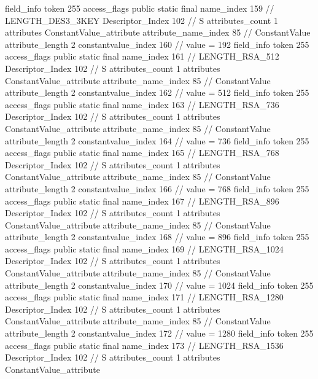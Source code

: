 {{{{{{{				}
				}
			}
			field_info {
				token	255
				access_flags	public static final
				name_index	159		// LENGTH_DES3_3KEY
				Descriptor_Index	102		// S
				attributes_count	1
				attributes {
				ConstantValue_attribute {
					attribute_name_index	85		// ConstantValue
					attribute_length	2
					constantvalue_index	160		// value = 192
				}
				}
			}
			field_info {
				token	255
				access_flags	public static final
				name_index	161		// LENGTH_RSA_512
				Descriptor_Index	102		// S
				attributes_count	1
				attributes {
				ConstantValue_attribute {
					attribute_name_index	85		// ConstantValue
					attribute_length	2
					constantvalue_index	162		// value = 512
				}
				}
			}
			field_info {
				token	255
				access_flags	public static final
				name_index	163		// LENGTH_RSA_736
				Descriptor_Index	102		// S
				attributes_count	1
				attributes {
				ConstantValue_attribute {
					attribute_name_index	85		// ConstantValue
					attribute_length	2
					constantvalue_index	164		// value = 736
				}
				}
			}
			field_info {
				token	255
				access_flags	public static final
				name_index	165		// LENGTH_RSA_768
				Descriptor_Index	102		// S
				attributes_count	1
				attributes {
				ConstantValue_attribute {
					attribute_name_index	85		// ConstantValue
					attribute_length	2
					constantvalue_index	166		// value = 768
				}
				}
			}
			field_info {
				token	255
				access_flags	public static final
				name_index	167		// LENGTH_RSA_896
				Descriptor_Index	102		// S
				attributes_count	1
				attributes {
				ConstantValue_attribute {
					attribute_name_index	85		// ConstantValue
					attribute_length	2
					constantvalue_index	168		// value = 896
				}
				}
			}
			field_info {
				token	255
				access_flags	public static final
				name_index	169		// LENGTH_RSA_1024
				Descriptor_Index	102		// S
				attributes_count	1
				attributes {
				ConstantValue_attribute {
					attribute_name_index	85		// ConstantValue
					attribute_length	2
					constantvalue_index	170		// value = 1024
				}
				}
			}
			field_info {
				token	255
				access_flags	public static final
				name_index	171		// LENGTH_RSA_1280
				Descriptor_Index	102		// S
				attributes_count	1
				attributes {
				ConstantValue_attribute {
					attribute_name_index	85		// ConstantValue
					attribute_length	2
					constantvalue_index	172		// value = 1280
				}
				}
			}
			field_info {
				token	255
				access_flags	public static final
				name_index	173		// LENGTH_RSA_1536
				Descriptor_Index	102		// S
				attributes_count	1
				attributes {
				ConstantValue_attribute {
}}}}}}}
